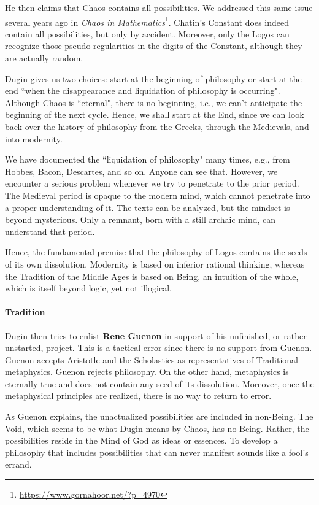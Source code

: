 He then claims that Chaos contains all possibilities. We addressed this same issue several years ago in \textit{Chaos in Mathematics}\footnote{\url{https://www.gornahoor.net/?p=4970}}. Chatin's Constant does indeed contain all possibilities, but only by accident. Moreover, only the Logos can recognize those pseudo-regularities in the digits of the Constant, although they are actually random.

Dugin gives us two choices: start at the beginning of philosophy or start at the end ``when the disappearance and liquidation of philosophy is occurring". Although Chaos is ``eternal", there is no beginning, i.e., we can't anticipate the beginning of the next cycle. Hence, we shall start at the End, since we can look back over the history of philosophy from the Greeks, through the Medievals, and into modernity.

We have documented the ``liquidation of philosophy" many times, e.g., from Hobbes, Bacon, Descartes, and so on. Anyone can see that. However, we encounter a serious problem whenever we try to penetrate to the prior period. The Medieval period is opaque to the modern mind, which cannot penetrate into a proper understanding of it. The texts can be analyzed, but the mindset is beyond mysterious. Only a remnant, born with a still archaic mind, can understand that period.

Hence, the fundamental premise that the philosophy of Logos contains the seeds of its own dissolution. Modernity is based on inferior rational thinking, whereas the Tradition of the Middle Ages is based on Being, an intuition of the whole, which is itself beyond logic, yet not illogical.

\paragraph{Tradition}
Dugin then tries to enlist \textbf{Rene Guenon} in support of his unfinished, or rather unstarted, project. This is a tactical error since there is no support from Guenon. Guenon accepts Aristotle and the Scholastics as representatives of Traditional metaphysics. Guenon rejects philosophy. On the other hand, metaphysics is eternally true and does not contain any seed of its dissolution. Moreover, once the metaphysical principles are realized, there is no way to return to error.

As Guenon explains, the unactualized possibilities are included in non-Being. The Void, which seems to be what Dugin means by Chaos, has no Being. Rather, the possibilities reside in the Mind of God as ideas or essences. To develop a philosophy that includes possibilities that can never manifest sounds like a fool's errand.

